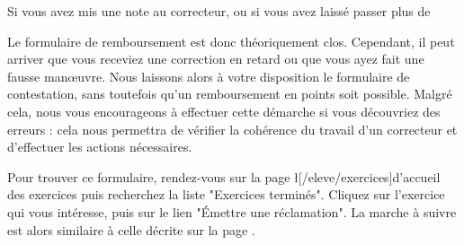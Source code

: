 ﻿Si vous avez mis une note au correcteur, ou si vous avez laissé passer plus de %

Le formulaire de remboursement est donc théoriquement clos. Cependant, il peut arriver que vous receviez une correction en retard ou que vous ayez fait une fausse manœuvre. Nous laissons alors à votre disposition le formulaire de contestation, sans toutefois qu'un remboursement en points soit possible.
Malgré cela, nous vous encourageons à effectuer cette démarche si vous découvriez des erreurs : cela nous permettra de vérifier la cohérence du travail d'un correcteur et d'effectuer les actions nécessaires.

Pour trouver ce formulaire, rendez-vous sur la page \l[/eleve/exercices]{d'accueil des exercices} puis recherchez la liste "Exercices terminés".
Cliquez sur l'exercice qui vous intéresse, puis sur le lien "Émettre une réclamation".
La marche à suivre est alors similaire à celle décrite sur la page .
